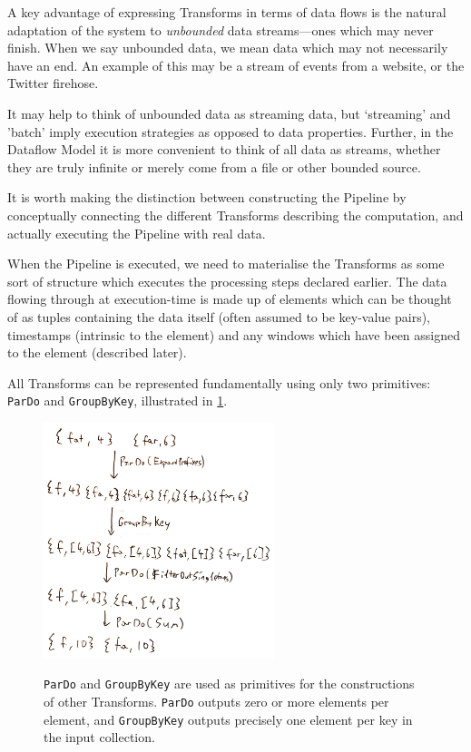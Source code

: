 A key advantage of expressing Transforms in terms of data flows is the natural adaptation of the system to \emph{unbounded} data streams---ones which may never finish.
When we say unbounded data, we mean data which may not necessarily have an end.
An example of this may be a stream of events from a website, or the Twitter firehose.

It may help to think of unbounded data as streaming data, but `streaming' and 'batch' imply execution strategies as opposed to data properties.
Further, in the Dataflow Model it is more convenient to think of all data as streams, whether they are truly infinite or merely come from a file or other bounded source.

It is worth making the distinction between constructing the Pipeline by conceptually connecting the different Transforms describing the computation, and actually executing the Pipeline with real data.

When the Pipeline is executed, we need to materialise the Transforms as some sort of structure which executes the processing steps declared earlier.
The data flowing through at execution-time is made up of elements which can be thought of as tuples containing the data itself (often assumed to be key-value pairs), timestamps (intrinsic to the element) and any windows which have been assigned to the element (described later).

All Transforms can be represented fundamentally using only two primitives: \verb|ParDo| and \verb|GroupByKey|\footnotemark[2], illustrated in \cref{fig:prep:pardo-gbk}.


\begin{figure}[h]
	\centering
	\includegraphics[width=0.6\textwidth]{images/temp/pardo-gbk}
	\label{fig:prep:pardo-gbk}
	\caption[An illustration of the operation of \texttt{ParDo} and \texttt{GroupByKey}.]{\texttt{ParDo} and \texttt{GroupByKey} are used as primitives for the constructions of other Transforms. \texttt{ParDo} outputs zero or more elements per element, and \texttt{GroupByKey} outputs precisely one element per key in the input collection.}
\end{figure}


